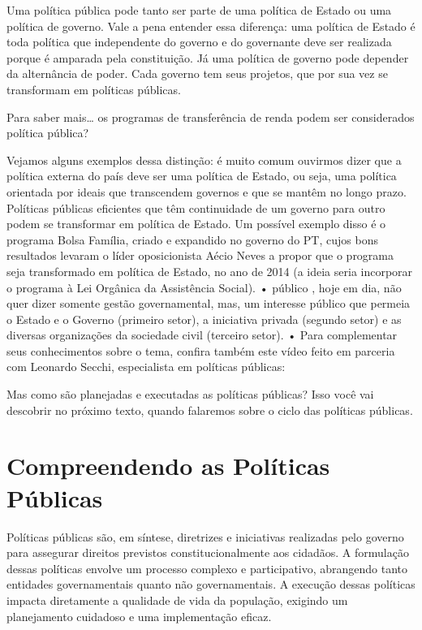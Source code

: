 \documentclass[
   article,       
   12pt,          
   oneside,       
   a4paper,       
   english,       
   brazil,        
   sumario=tradicional
   ]{abntex2}
\begin{document}
Uma política pública pode tanto ser parte de uma política de Estado ou uma política de governo. Vale a pena entender essa diferença: uma política de Estado é toda política que independente do governo e do governante deve ser realizada porque é amparada pela constituição. Já uma política de governo pode depender da alternância de poder. Cada governo tem seus projetos, que por sua vez se transformam em políticas públicas.

Para saber mais… os programas de transferência de renda podem ser considerados política pública?

Vejamos alguns exemplos dessa distinção: é muito comum ouvirmos dizer que a política externa do país deve ser uma política de Estado, ou seja, uma política orientada por ideais que transcendem governos e que se mantêm no longo prazo. Políticas públicas eficientes que têm continuidade de um governo para outro podem se transformar em política de Estado. Um possível exemplo disso é o programa Bolsa Família, criado e expandido no governo do PT, cujos bons resultados levaram o líder oposicionista Aécio Neves a propor que o programa seja transformado em política de Estado, no ano de 2014 (a ideia seria incorporar o programa à Lei Orgânica da Assistência Social).
• público , hoje em dia, não quer dizer somente gestão governamental, mas, um interesse público que permeia o Estado e o Governo (primeiro setor), a iniciativa privada (segundo setor) e as diversas organizações da sociedade civil (terceiro setor).
• Para complementar seus conhecimentos sobre o tema, confira também este vídeo feito em parceria com Leonardo Secchi, especialista em políticas públicas:

Mas como são planejadas e executadas as políticas públicas? Isso você vai descobrir no próximo texto, quando falaremos sobre o ciclo das políticas públicas. 

\section{Compreendendo as Políticas Públicas}

Políticas públicas são, em síntese, diretrizes e iniciativas realizadas pelo governo para assegurar direitos previstos constitucionalmente aos cidadãos. A formulação dessas políticas envolve um processo complexo e participativo, abrangendo tanto entidades governamentais quanto não governamentais. A execução dessas políticas impacta diretamente a qualidade de vida da população, exigindo um planejamento cuidadoso e uma implementação eficaz.
\end{document}
